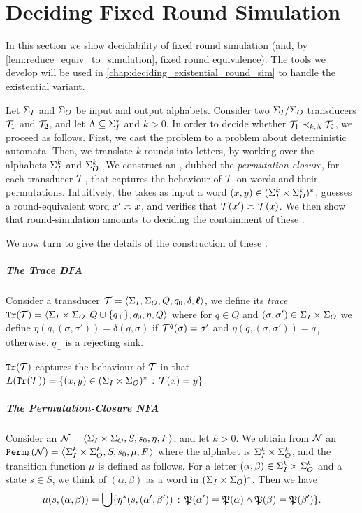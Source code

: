 \chapter{Deciding Fixed Round Simulation}
\label{chap:deciding_fixed_round_sim}

In this section we show decidability of fixed round simulation (and, by \autoref{lem:reduce_equiv_to_simulation}, fixed round equivalence). The tools we develop will be used in \autoref{chap:deciding_existential_round_sim} to handle the existential variant.

Let $\Sigma_{I}$ and $\Sigma_{O}$ be input and output alphabets. Consider two $\Sigma_{I}/\Sigma_{O}$ transducers $\mathcal{T}_1$ and $\mathcal{T}_2$, and let $\Lambda\subseteq \Sigma_{I}^*$ and $k>0$.
In order to decide whether $\mathcal{T}_1\prec_{k,\Lambda} \mathcal{T}_2$, we proceed as follows. First, we cast the problem to a problem about deterministic automata. Then, we translate $k$-rounds into letters, by working over the alphabets $\Sigma_{I}^k$ and $\Sigma_{O}^k$. We construct an \NFA, dubbed the \emph{permutation closure}, for each transducer $\mathcal{T}$, that captures the behaviour of $\mathcal{T}$ on words and their permutations. Intuitively, the \NFA takes as input a word $(x,y)\in (\Sigma_{I}^{k}\times \Sigma_{O}^k)^*$, guesses a round-equivalent word $x'\asymp_{} x$, and verifies that $\mathcal{T}(x')\asymp_{} \mathcal{T}(x)$. We then show that round-simulation amounts to deciding the containment of these \NFAs.

We now turn to give the details of the construction of these \NFAs.

\paragraph{The Trace \bf DFA} Consider a transducer $\mathcal{T}=\left< \Sigma_{I},\Sigma_{O},Q,q_0,\delta,\boldsymbol{\ell}\right>$, we define its \emph{trace \DFA} ${\mathtt{Tr}}(\mathcal{T})=\left< \Sigma_{I}\times\Sigma_{O},Q\cup\{q_{\bot}\},q_0,\eta,Q\right>$ where for $q\in Q$ and $(\sigma,\sigma')\in \Sigma_{I}\times \Sigma_{O}$ we define $\eta(q,(\sigma,\sigma'))=\delta(q,\sigma)$ if $\mathcal{T}^{q}(\sigma)=\sigma'$ and $\eta(q,(\sigma,\sigma'))=q_{\bot}$ otherwise.
$q_\bot$ is a rejecting sink. 

${\mathtt{Tr}}(\mathcal{T})$ captures the behaviour of $\mathcal{T}$ in that $L({\mathtt{Tr}}(\mathcal{T}))=\{(x,y)\in (\Sigma_{I}\times \Sigma_{O})^*\, :\, \mathcal{T}(x)=y\}$. 

\paragraph{The Permutation-Closure \bf NFA}
Consider an \NFA $\mathcal{N}=\left< \Sigma_{I}\times\Sigma_{O},S,s_0,\eta,F\right>$, and let $k>0$. 
We obtain from $\mathcal{N}$ an \NFA ${\mathtt{Perm}}_k(\mathcal{N})=\left< \Sigma_{I}^k \times \Sigma_{O}^k,S, s_0, \mu, F\right>$
where the alphabet is $\Sigma_{I}^k\times \Sigma_{O}^k$, and the transition function $\mu$ is defined as follows. For a letter $(\alpha,\beta)\in \Sigma_{I}^k \times \Sigma_{O}^k$ and a state $s\in S$, we think of $(\alpha,\beta)$ as a word in $(\Sigma_{I}\times \Sigma_{O})^*$. Then we have
\begin{equation}
\label{test}
    \mu(s,(\alpha,\beta))=\bigcup\{\eta^*(s,(\alpha',\beta')) \, :\, \mathfrak{P}(\alpha')=\mathfrak{P}(\alpha) \wedge \mathfrak{P}(\beta)=\mathfrak{P}(\beta')\}.
\end{equation}

